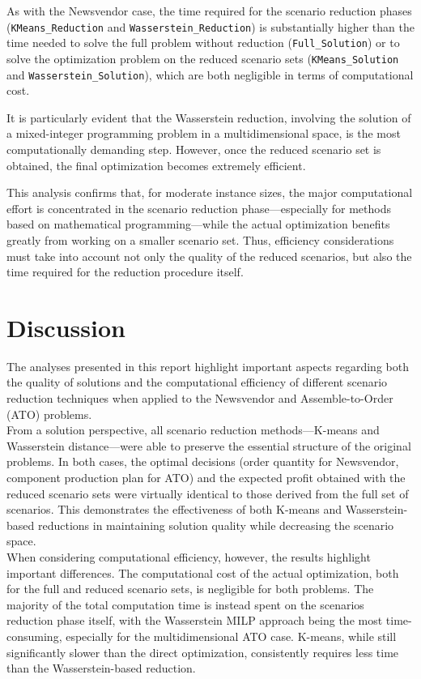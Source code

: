 \documentclass[a4paper,12pt]{article}
\begin{document}
	
	As with the Newsvendor case, the time required for the scenario reduction phases (\texttt{KMeans\_Reduction} and \texttt{Wasserstein\_Reduction}) is substantially higher than the time needed to solve the full problem without reduction (\texttt{Full\_Solution}) or to solve the optimization problem on the reduced scenario sets (\texttt{KMeans\_Solution} and \texttt{Wasserstein\_Solution}), which are both negligible in terms of computational cost.
	
	It is particularly evident that the Wasserstein reduction, involving the solution of a mixed-integer programming problem in a multidimensional space, is the most computationally demanding step. However, once the reduced scenario set is obtained, the final optimization becomes extremely efficient. 
	
	This analysis confirms that, for moderate instance sizes, the major computational effort is concentrated in the scenario reduction phase—especially for methods based on mathematical programming—while the actual optimization benefits greatly from working on a smaller scenario set. Thus, efficiency considerations must take into account not only the quality of the reduced scenarios, but also the time required for the reduction procedure itself.
	
	\section{Discussion}
	
	The analyses presented in this report highlight important aspects regarding both the quality of solutions and the computational efficiency of different scenario reduction techniques when applied to the Newsvendor and Assemble-to-Order (ATO) problems.\\
	
	From a solution perspective, all scenario reduction methods—K-means and Wasserstein distance—were able to preserve the essential structure of the original problems. In both cases, the optimal decisions (order quantity for Newsvendor, component production plan for ATO) and the expected profit obtained with the reduced scenario sets were virtually identical to those derived from the full set of scenarios. This demonstrates the effectiveness of both K-means and Wasserstein-based reductions in maintaining solution quality while decreasing the scenario space.\\
	
	When considering computational efficiency, however, the results highlight important differences. The computational cost of the actual optimization, both for the full and reduced scenario sets, is negligible for both problems. The majority of the total computation time is instead spent on the scenarios reduction phase itself, with the Wasserstein MILP approach being the most time-consuming, especially for the multidimensional ATO case. K-means, while still significantly slower than the direct optimization, consistently requires less time than the Wasserstein-based reduction.\\
	
\end{document}
